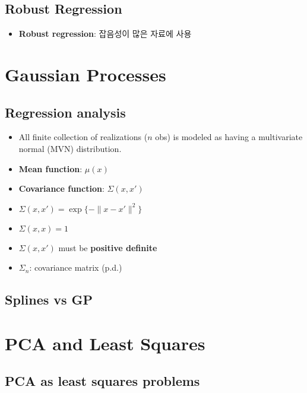\documentclass[
  letterpaper,
  DIV=11,
  numbers=noendperiod]{scrreprt}
\providecommand{\tightlist}{%
  \setlength{\itemsep}{0pt}\setlength{\parskip}{0pt}}\usepackage{longtable,booktabs,array}
\theoremstyle{definition}
\theoremstyle{plain}
\theoremstyle{remark}
\begin{document}
\section{Robust Regression}\label{robust-regression-1}

\begin{itemize}
\tightlist
\item
  \textbf{Robust regression}: 잡음성이 많은 자료에 사용
\end{itemize}

\chapter{Gaussian Processes}\label{gaussian-processes}

\section{Regression analysis}\label{regression-analysis-1}

\begin{itemize}
\item
  All finite collection of realizations (\(n\) obs) is modeled as having
  a multivariate normal (MVN) distribution.
\item
  \textbf{Mean function}: \(\mu (x)\)
\item
  \textbf{Covariance function}: \(\Sigma (x, x')\)
\item
  \(\Sigma (x, x') = \exp \{ - \| x- x' \|^2 \}\)
\item
  \(\Sigma (x, x )=1\)
\item
  \(\Sigma (x, x')\) must be \textbf{positive definite}
\item
  \(\Sigma_n\): covariance matrix (p.d.)
\end{itemize}

\section{Splines vs GP}\label{splines-vs-gp}

\chapter{PCA and Least Squares}\label{pca-and-least-squares}

\section{PCA as least squares
problems}\label{pca-as-least-squares-problems}
\end{document}
